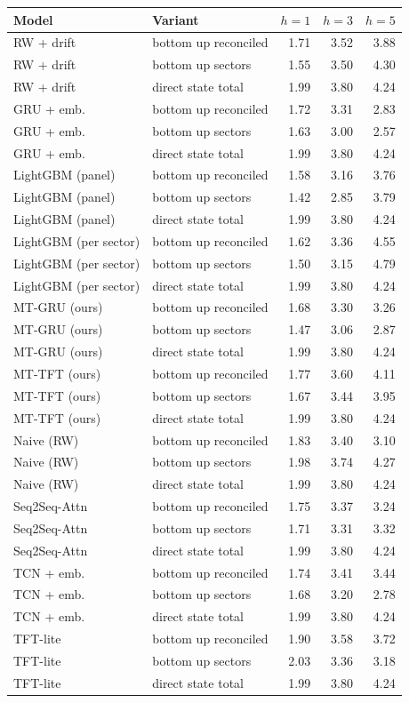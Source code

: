 \begin{tabular}{llrrr}
\toprule
Model & Variant & $h{=}1$ & $h{=}3$ & $h{=}5$ \\
\midrule
RW + drift & bottom up reconciled & 1.71 & 3.52 & 3.88 \\
RW + drift & bottom up sectors & 1.55 & 3.50 & 4.30 \\
RW + drift & direct state total & 1.99 & 3.80 & 4.24 \\
GRU + emb. & bottom up reconciled & 1.72 & 3.31 & 2.83 \\
GRU + emb. & bottom up sectors & 1.63 & 3.00 & 2.57 \\
GRU + emb. & direct state total & 1.99 & 3.80 & 4.24 \\
LightGBM (panel) & bottom up reconciled & 1.58 & 3.16 & 3.76 \\
LightGBM (panel) & bottom up sectors & 1.42 & 2.85 & 3.79 \\
LightGBM (panel) & direct state total & 1.99 & 3.80 & 4.24 \\
LightGBM (per sector) & bottom up reconciled & 1.62 & 3.36 & 4.55 \\
LightGBM (per sector) & bottom up sectors & 1.50 & 3.15 & 4.79 \\
LightGBM (per sector) & direct state total & 1.99 & 3.80 & 4.24 \\
MT-GRU (ours) & bottom up reconciled & 1.68 & 3.30 & 3.26 \\
MT-GRU (ours) & bottom up sectors & 1.47 & 3.06 & 2.87 \\
MT-GRU (ours) & direct state total & 1.99 & 3.80 & 4.24 \\
MT-TFT (ours) & bottom up reconciled & 1.77 & 3.60 & 4.11 \\
MT-TFT (ours) & bottom up sectors & 1.67 & 3.44 & 3.95 \\
MT-TFT (ours) & direct state total & 1.99 & 3.80 & 4.24 \\
Naive (RW) & bottom up reconciled & 1.83 & 3.40 & 3.10 \\
Naive (RW) & bottom up sectors & 1.98 & 3.74 & 4.27 \\
Naive (RW) & direct state total & 1.99 & 3.80 & 4.24 \\
Seq2Seq-Attn & bottom up reconciled & 1.75 & 3.37 & 3.24 \\
Seq2Seq-Attn & bottom up sectors & 1.71 & 3.31 & 3.32 \\
Seq2Seq-Attn & direct state total & 1.99 & 3.80 & 4.24 \\
TCN + emb. & bottom up reconciled & 1.74 & 3.41 & 3.44 \\
TCN + emb. & bottom up sectors & 1.68 & 3.20 & 2.78 \\
TCN + emb. & direct state total & 1.99 & 3.80 & 4.24 \\
TFT-lite & bottom up reconciled & 1.90 & 3.58 & 3.72 \\
TFT-lite & bottom up sectors & 2.03 & 3.36 & 3.18 \\
TFT-lite & direct state total & 1.99 & 3.80 & 4.24 \\
\bottomrule
\end{tabular}
